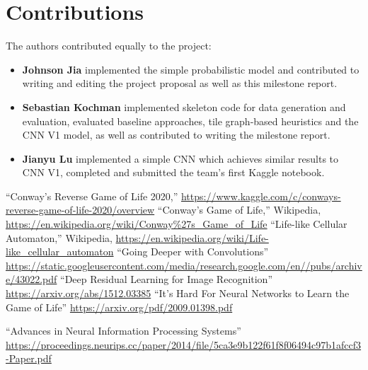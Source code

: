 \documentclass[conference]{IEEEtran}
\begin{document}
\section{Contributions}
The authors contributed equally to the project: %
\begin{itemize}
    \item \textbf{Johnson Jia} implemented the simple probabilistic model and contributed to writing and editing the project proposal as well as this milestone report.

    \item \textbf{Sebastian Kochman} implemented skeleton code for data generation and evaluation, evaluated baseline approaches, tile graph-based heuristics and the CNN V1 model, as well as contributed to writing the milestone report.

    \item \textbf{Jianyu Lu} implemented a simple CNN which achieves similar results to CNN V1, completed and submitted the team's first Kaggle notebook.

\end{itemize}

\begin{thebibliography}{00}         
 ``Conway's Reverse Game of Life 2020,'' \url{https://www.kaggle.com/c/conways-reverse-game-of-life-2020/overview}
 ``Conway's Game of Life,'' Wikipedia, \url{https://en.wikipedia.org/wiki/Conway\%27s_Game_of_Life}
 ``Life-like Cellular Automaton,'' Wikipedia, \url{https://en.wikipedia.org/wiki/Life-like_cellular_automaton}
 ``Going Deeper with Convolutions'' \url{https://static.googleusercontent.com/media/research.google.com/en//pubs/archive/43022.pdf}
 ``Deep Residual Learning for Image Recognition''
\url{https://arxiv.org/abs/1512.03385}
 ``It’s Hard For Neural Networks to Learn the Game of
Life''
\url{https://arxiv.org/pdf/2009.01398.pdf}

 ``Advances in Neural Information Processing Systems''
\url{https://proceedings.neurips.cc/paper/2014/file/5ca3e9b122f61f8f06494c97b1afccf3-Paper.pdf}
\author[]{Goodfellow, Ian and Pouget-Abadie, Jean and Mirza, Mehdi and Xu, Bing and Warde-Farley, David and Ozair, Sherjil and Courville, Aaron and Bengio, Yoshua}

\iffalse
@misc{goodfellow2014generative,
      title={Generative Adversarial Networks}, 
      author={Ian J. Goodfellow and Jean Pouget-Abadie and Mehdi Mirza and Bing Xu and David Warde-Farley and Sherjil Ozair and Aaron Courville and Yoshua Bengio},
      year={2014},
      eprint={1406.2661},
      archivePrefix={arXiv},
      primaryClass={stat.ML}
}
\fi

\end{thebibliography}
\end{document}
